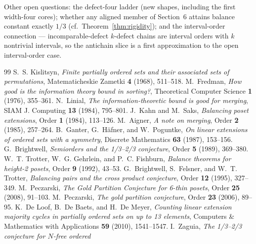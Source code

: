 \documentclass[11pt]{article}
\theoremstyle{definition}
\theoremstyle{remark}
\begin{document}
Other open questions: the defect-four ladder (new shapes, including the first
width-four cores); whether any aligned member of Section~6 attains balance constant
exactly $1/3$ (cf.\ Theorem~\ref{thm:rigidity}); and the interval-order connection ---
incomparable-defect $k$-defect chains are interval orders with $k$ nontrivial intervals,
so the antichain slice is a first approximation to the open interval-order case.

\begin{thebibliography}{99}
 S.~S. Kislitsyn, \emph{Finite partially ordered sets and their
associated sets of permutations}, Matematicheskie Zametki \textbf{4} (1968), 511--518.
 M.~Fredman, \emph{How good is the information theory bound in sorting?},
Theoretical Computer Science \textbf{1} (1976), 355--361.
 N.~Linial, \emph{The information-theoretic bound is good for merging},
SIAM J. Computing \textbf{13} (1984), 795--801.
 J.~Kahn and M.~Saks, \emph{Balancing poset extensions}, Order
\textbf{1} (1984), 113--126.
 M.~Aigner, \emph{A note on merging}, Order \textbf{2} (1985), 257--264.
 B.~Ganter, G.~H\"afner, and W.~Poguntke, \emph{On linear extensions of
ordered sets with a symmetry}, Discrete Mathematics \textbf{63} (1987), 153--156.
 G.~Brightwell, \emph{Semiorders and the 1/3--2/3 conjecture},
Order \textbf{5} (1989), 369--380.
 W.~T. Trotter, W.~G. Gehrlein, and P.~C. Fishburn, \emph{Balance theorems
for height-2 posets}, Order \textbf{9} (1992), 43--53.
 G.~Brightwell, S.~Felsner, and W.~T. Trotter, \emph{Balancing pairs and the
cross product conjecture}, Order \textbf{12} (1995), 327--349.
 M.~Peczarski, \emph{The Gold Partition Conjecture for 6-thin
posets}, Order \textbf{25} (2008), 91--103.
 M.~Peczarski, \emph{The gold partition conjecture}, Order
\textbf{23} (2006), 89--95. %
 K.~De Loof, B.~De Baets, and H.~De Meyer, \emph{Counting linear
extension majority cycles in partially ordered sets on up to 13 elements}, Computers \&
Mathematics with Applications \textbf{59} (2010), 1541--1547.
 I.~Zaguia, \emph{The 1/3--2/3 conjecture for $N$-free ordered
}
\end{thebibliography}
\end{document}
